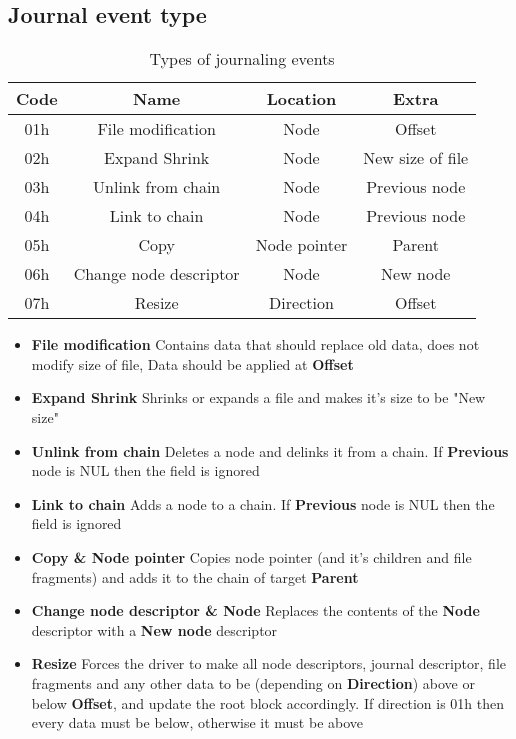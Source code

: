 \documentclass[12pt]{article}
\begin{document}
\newpage

\subsection{Journal event type}

\begin{table}
\centering
\begin{tabular}{ |c|c|c|c| }
\hline
Code & Name & Location & Extra \\
\hline
01h & File modification & Node & Offset \\
02h & Expand Shrink & Node & New size of file \\
03h & Unlink from chain & Node & Previous node \\
04h & Link to chain & Node & Previous node \\
05h & Copy & Node pointer & Parent \\
06h & Change node descriptor & Node & New node \\
07h & Resize & Direction & Offset \\
\hline
\end{tabular}
\caption{Types of journaling events}
\end{table}

\begin{itemize}
	\item \textbf{File modification} Contains data that should replace old data, does not modify size of file, Data should be applied at \textbf{Offset}
	\item \textbf{Expand Shrink} Shrinks or expands a file and makes it's size to be "New size"
	\item \textbf{Unlink from chain} Deletes a node and delinks it from a chain. If \textbf{Previous} node is NUL then the field is ignored
	\item \textbf{Link to chain} Adds a node to a chain. If \textbf{Previous} node is NUL then the field is ignored
	\item \textbf{Copy \& Node pointer} Copies node pointer (and it's children and file fragments) and adds it to the chain of target \textbf{Parent}
	\item \textbf{Change node descriptor \& Node} Replaces the contents of the \textbf{Node} descriptor with a \textbf{New node} descriptor
	\item \textbf{Resize} Forces the driver to make all node descriptors, journal descriptor, file fragments and any other data to be (depending on \textbf{Direction}) above or below \textbf{Offset}, and update the root block accordingly. If direction is 01h then every data must be below, otherwise it must be above
\end{itemize}
\end{document}
